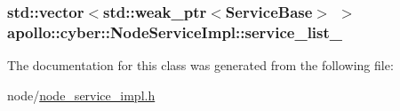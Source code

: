 \hypertarget{classapollo_1_1cyber_1_1NodeServiceImpl_a5c763412befbe5299c797e670d4be36d}{
\subsubsection[{service\-\_\-list\-\_\-}]{\setlength{\rightskip}{0pt plus 5cm}std\-::vector$<$std\-::weak\-\_\-ptr$<${\bf Service\-Base}$>$ $>$ apollo\-::cyber\-::\-Node\-Service\-Impl\-::service\-\_\-list\-\_\-\hspace{0.3cm}{\ttfamily [private]}}}\label{classapollo_1_1cyber_1_1NodeServiceImpl_a5c763412befbe5299c797e670d4be36d}


The documentation for this class was generated from the following file\-:\begin{DoxyCompactItemize}
\item 
node/\hyperlink{node__service__impl_8h}{node\-\_\-service\-\_\-impl.\-h}\end{DoxyCompactItemize}
